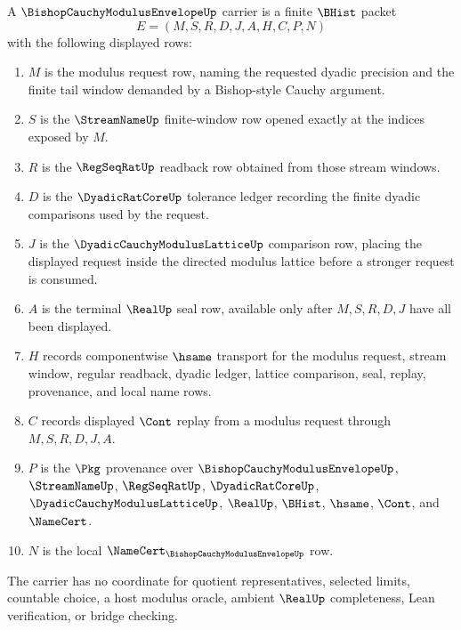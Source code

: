 \begin{definition}
\label{def:bishop-cauchy-modulus-envelope-carrier}
A $\BishopCauchyModulusEnvelopeUp$ carrier is a finite $\BHist$ packet
$$
E=(M,S,R,D,J,A,H,C,P,N)
$$
with the following displayed rows:
\begin{enumerate}
\item $M$ is the modulus request row, naming the requested dyadic precision and the finite tail window demanded by a Bishop-style Cauchy argument.
\item $S$ is the $\StreamNameUp$ finite-window row opened exactly at the indices exposed by $M$.
\item $R$ is the $\RegSeqRatUp$ readback row obtained from those stream windows.
\item $D$ is the $\DyadicRatCoreUp$ tolerance ledger recording the finite dyadic comparisons used by the request.
\item $J$ is the $\DyadicCauchyModulusLatticeUp$ comparison row, placing the displayed request inside the directed modulus lattice before a stronger request is consumed.
\item $A$ is the terminal $\RealUp$ seal row, available only after $M,S,R,D,J$ have all been displayed.
\item $H$ records componentwise $\hsame$ transport for the modulus request, stream window, regular readback, dyadic ledger, lattice comparison, seal, replay, provenance, and local name rows.
\item $C$ records displayed $\Cont$ replay from a modulus request through $M,S,R,D,J,A$.
\item $P$ is the $\Pkg$ provenance over $\BishopCauchyModulusEnvelopeUp$, $\StreamNameUp$, $\RegSeqRatUp$, $\DyadicRatCoreUp$, $\DyadicCauchyModulusLatticeUp$, $\RealUp$, $\BHist$, $\hsame$, $\Cont$, and $\NameCert$.
\item $N$ is the local $\NameCert_{\BishopCauchyModulusEnvelopeUp}$ row.
\end{enumerate}
The carrier has no coordinate for quotient representatives, selected limits, countable choice, a host modulus oracle, ambient $\RealUp$ completeness, Lean verification, or bridge checking.
\end{definition}

